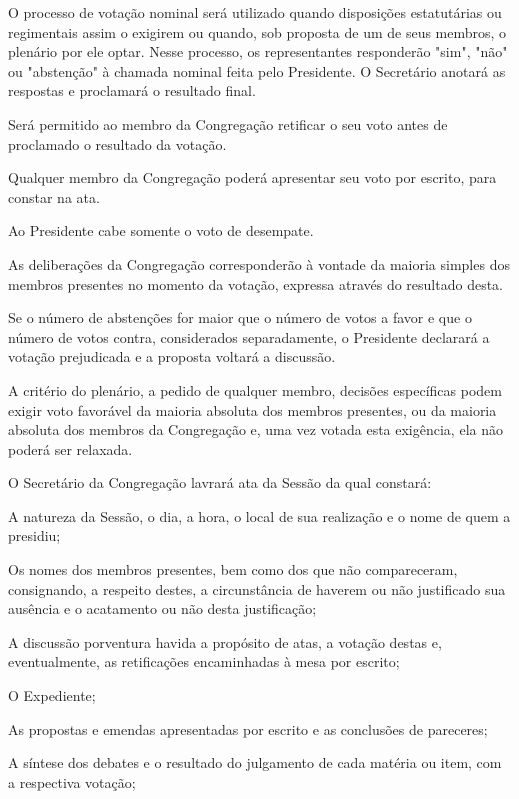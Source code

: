 \documentclass{documento}
\begin{document}
\artigo O processo de votação nominal será utilizado quando disposições estatutárias ou regimentais assim o exigirem ou quando, sob proposta de um de seus membros, o plenário por ele optar. Nesse processo, os representantes responderão "sim", "não" ou "abstenção" à chamada nominal feita pelo Presidente. O Secretário anotará as respostas e proclamará o resultado final.

\artigo Será permitido ao membro da Congregação retificar o seu voto antes de proclamado o resultado da votação.

\artigo Qualquer membro da Congregação poderá apresentar seu voto por escrito, para constar na ata.

\artigo Ao Presidente cabe somente o voto de desempate.

\artigo As deliberações da Congregação corresponderão à vontade da maioria simples dos membros presentes no momento da votação, expressa através do resultado desta.

\paragrafo Se o número de abstenções for maior que o número de votos a favor e que o número de votos contra, considerados separadamente, o Presidente declarará a votação prejudicada e a proposta voltará a discussão.

\paragrafo A critério do plenário, a pedido de qualquer membro, decisões específicas podem exigir voto favorável da maioria absoluta dos membros presentes, ou da maioria absoluta dos membros da Congregação e, uma vez votada esta exigência, ela não poderá ser relaxada.


\artigo O Secretário da Congregação lavrará ata da Sessão da qual constará:

\inciso A natureza da Sessão, o dia, a hora, o local de sua realização e o nome de quem a presidiu;

\inciso Os nomes dos membros presentes, bem como dos que não compareceram, consignando, a respeito destes, a circunstância de haverem ou não justificado sua ausência e o acatamento ou não desta justificação;

\inciso A discussão porventura havida a propósito de atas, a votação destas e, eventualmente, as retificações encaminhadas à mesa por escrito;

\inciso O Expediente;

\inciso As propostas e emendas apresentadas por escrito e as conclusões de pareceres;

\inciso A síntese dos debates e o resultado do julgamento de cada matéria ou item, com a respectiva votação;
\end{document}
